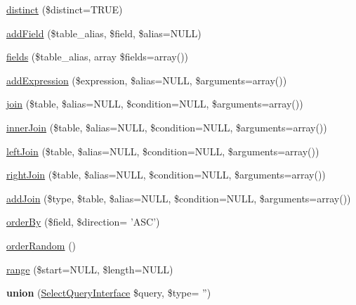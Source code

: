 \begin{DoxyCompactItemize}
\item 
\hyperlink{classSelectQueryExtender_a8e0cb58f3c0b4e6d535bf75703aad7bc}{distinct} (\$distinct=TRUE)
\item 
\hyperlink{classSelectQueryExtender_ab5d7e784fcc0f74caa07a53ddc423f05}{addField} (\$table\_\-alias, \$field, \$alias=NULL)
\item 
\hyperlink{classSelectQueryExtender_a5b4e0bd5f5e383054a8580dd4fbac077}{fields} (\$table\_\-alias, array \$fields=array())
\item 
\hyperlink{classSelectQueryExtender_a6e05e811e495e6f36fb0ec1ef21abbc1}{addExpression} (\$expression, \$alias=NULL, \$arguments=array())
\item 
\hyperlink{classSelectQueryExtender_a6b9998d4e438ab3edc2867e32a5c120c}{join} (\$table, \$alias=NULL, \$condition=NULL, \$arguments=array())
\item 
\hyperlink{classSelectQueryExtender_a4c37ec31ec8dce6287cb5d211886b23e}{innerJoin} (\$table, \$alias=NULL, \$condition=NULL, \$arguments=array())
\item 
\hyperlink{classSelectQueryExtender_aad9dd7062882479b2eb466fbe8dbd950}{leftJoin} (\$table, \$alias=NULL, \$condition=NULL, \$arguments=array())
\item 
\hyperlink{classSelectQueryExtender_af2012b63276cf32b2422d342d257c835}{rightJoin} (\$table, \$alias=NULL, \$condition=NULL, \$arguments=array())
\item 
\hyperlink{classSelectQueryExtender_ad6b6dd29f9c4de6129030be8d110d6ee}{addJoin} (\$type, \$table, \$alias=NULL, \$condition=NULL, \$arguments=array())
\item 
\hyperlink{classSelectQueryExtender_a7ed1e21116ca34f68a9d1c14e6c31096}{orderBy} (\$field, \$direction= 'ASC')
\item 
\hyperlink{classSelectQueryExtender_afd183cab845d100b7890ff8cdfb380d4}{orderRandom} ()
\item 
\hyperlink{classSelectQueryExtender_a83b472a48decf872faf61ded0c576697}{range} (\$start=NULL, \$length=NULL)
\item 
\hypertarget{classSelectQueryExtender_a76bc43cb0499bc568da2b243d033ef6e}{
{\bfseries union} (\hyperlink{interfaceSelectQueryInterface}{SelectQueryInterface} \$query, \$type= '')}
\label{classSelectQueryExtender_a76bc43cb0499bc568da2b243d033ef6e}


\end{DoxyCompactItemize}
